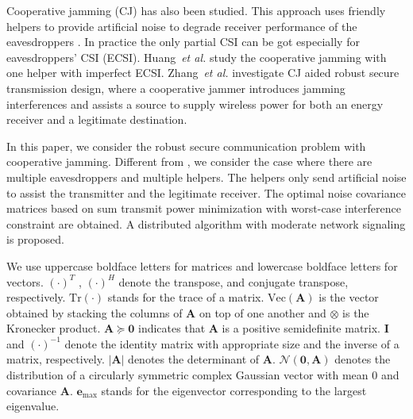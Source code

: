 \documentclass[journal]{IEEEtran}
\begin{document}

Cooperative jamming (CJ) has also been studied. This approach uses friendly helpers to provide artificial noise to degrade receiver performance of the eavesdroppers \cite{cooperative_jamming,huang_cooperative_2011,dong_improving_2010,li_cooperative_2011,zheng_optimal_2011,liao_qos-based_2011}. In practice the only partial CSI can be got especially for eavesdroppers’ CSI (ECSI).  Huang~\emph{et al.} study the cooperative jamming with one helper with imperfect ECSI\cite{huang_robust_2012}. Zhang~\emph{et al.} investigate CJ aided robust secure transmission design, where a cooperative jammer introduces jamming interferences and assists a source to supply wireless power for both an energy receiver and a legitimate destination\cite{Zhang_Cooperative2015}. 

In this paper, we consider the robust secure communication problem with cooperative jamming.  Different from \cite{huang_robust_2012,Zhang_Cooperative2015}, we consider the case where there are multiple eavesdroppers and multiple helpers. The helpers only send artificial noise to assist the transmitter and the legitimate receiver. The optimal noise covariance matrices based on sum transmit power minimization with worst-case interference constraint are obtained. A distributed algorithm with moderate network signaling is proposed. 

We use uppercase boldface letters for matrices and lowercase boldface letters for vectors. $(\cdot)^T$ , $(\cdot)^H$ denote the transpose, and conjugate transpose, respectively.
$\text{Tr}(\cdot)$ stands for the trace of a matrix. $\text{Vec}(\mathbf{A})$ is the vector obtained by stacking the columns of $\mathbf{A}$ on top of one another and $\otimes$ is the Kronecker product. $\mathbf{A} \succeq \mathbf{0}$ indicates that
$\mathbf{A}$ is a positive semidefinite matrix. $\mathbf{I}$ and $(\cdot)^{-1}$ denote the
identity matrix with appropriate size and the inverse of a matrix,
respectively. $|\mathbf{A}|$ denotes the
determinant of $\mathbf{A}$. $ \mathcal{N}(\mathbf{0}, \mathbf{A})$
denotes the distribution of a circularly symmetric complex Gaussian vector with mean 0 and covariance $\mathbf{A}$. $\mathbf{e}_{\text{max}}$ stands for the eigenvector corresponding to the largest eigenvalue.
\end{document}
